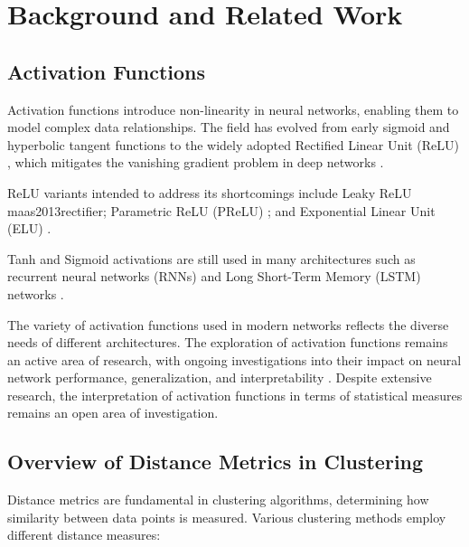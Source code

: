 \section{Background and Related Work}

\subsection{Activation Functions}

Activation functions introduce non-linearity in neural networks, enabling them to model complex data relationships. The field has evolved from early sigmoid and hyperbolic tangent functions \citep{rosenblatt1958perceptron} to the widely adopted Rectified Linear Unit (ReLU) \citep{nair2010rectified}, which mitigates the vanishing gradient problem in deep networks \citep{glorot2010understanding, krizhevsky2012imagenet}.

ReLU variants intended to address its shortcomings include Leaky ReLU {maas2013rectifier}; Parametric ReLU (PReLU) \citep{he2015delving}; and Exponential Linear Unit (ELU) \citep{clevert2015fast}.

Tanh and Sigmoid activations are still used in many architectures such as recurrent neural networks (RNNs) and Long Short-Term Memory (LSTM) networks \citep{hochreiter1997long}.

The variety of activation functions used in modern networks reflects the diverse needs of different architectures. The exploration of activation functions remains an active area of research, with ongoing investigations into their impact on neural network performance, generalization, and interpretability \citep{ramachandran2017searching}. Despite extensive research, the interpretation of activation functions in terms of statistical measures remains an open area of investigation.

\subsection{Overview of Distance Metrics in Clustering}

Distance metrics are fundamental in clustering algorithms, determining how similarity between data points is measured. Various clustering methods employ different distance measures:

